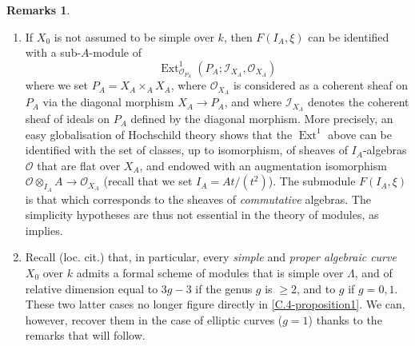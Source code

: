\documentclass{article}
\theoremstyle{plain}
\theoremstyle{definition}
\newtheorem*{remarks*}{Remarks}
\newcommand{\sh}[1]{{\mathscr{#1}}}
\renewcommand{\geq}{\geqslant}
\DeclareMathOperator{\Ext}{Ext}
\begin{document}
\begin{remarks*}
  \begin{enumerate}
    \item If $X_0$ is not assumed to be simple over $k$, then $F(I_A,\xi)$ can be identified with a sub-$A$-module of
      \[
        \Ext_{\sh{O}_{P_A}}^1(P_A;\sh{I}_{X_A},\sh{O}_{X_A})
      \]
      where we set $P_A=X_A\times_A X_A$, where $\sh{O}_{X_A}$ is considered as a coherent sheaf on $P_A$ via the diagonal morphism $X_A\to P_A$, and where $\sh{I}_{X_A}$ denotes the coherent sheaf of ideals on $P_A$ defined by the diagonal morphism.
      More precisely, an easy globalisation of Hochschild theory shows that the $\Ext^1$ above can be identified with the set of classes, up to isomorphism, of sheaves of $I_A$-algebras $\sh{O}$ that are flat over $X_A$, and endowed with an augmentation isomorphism $\sh{O}\otimes_{I_A}A\to\sh{O}_{X_A}$ (recall that we set $I_A=At/(t^2)$).
      The submodule $F(I_A,\xi)$ is that which corresponds to the sheaves of \emph{commutative} algebras.
      The simplicity hypotheses are thus not essential in the theory of modules, as \cite{2} implies.
    \item Recall (loc. cit.) that, in particular, every \emph{simple} and \emph{proper algebraic curve} $X_0$ over $k$ admits a formal scheme of modules that is simple over $\Lambda$, and of relative dimension equal to $3g-3$ if the genus $g$ is $\geq2$, and to $g$ if $g=0,1$.
      These two latter cases no longer figure directly in \cref{C.4-proposition1}.
      We can, however, recover them in the case of elliptic curves ($g=1$) thanks to the remarks that will follow.
  \end{enumerate}
\end{remarks*}
\end{document}

